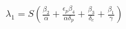 \documentclass[preview]{standalone}
\begin{document}
\begin{center}
$\lambda_1 = S ( \frac{\beta_2}{\alpha} + \frac{\epsilon_p \beta_4}{\alpha \delta_p} + \frac{\beta_3}{\delta_c} + \frac{\beta_1}{\gamma} )$
\end{center}
\end{document}
